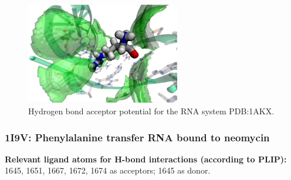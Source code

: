       \begin{figure}[H]
        \centering
        \includegraphics[width=0.6\textwidth]{figures/results/benchmark_rna/1akx.png}
        \caption{\label{fig:benchmark/1akx} Hydrogen bond acceptor potential for the RNA system PDB:1AKX.}
      \end{figure}
    \pagebreak

    \subsubsection{1I9V: Phenylalanine transfer RNA bound to neomycin}
      \textbf{Relevant ligand atoms for H-bond interactions (according to PLIP):} 1645, 1651, 1667, 1672, 1674 as acceptors; 1645 as donor.

